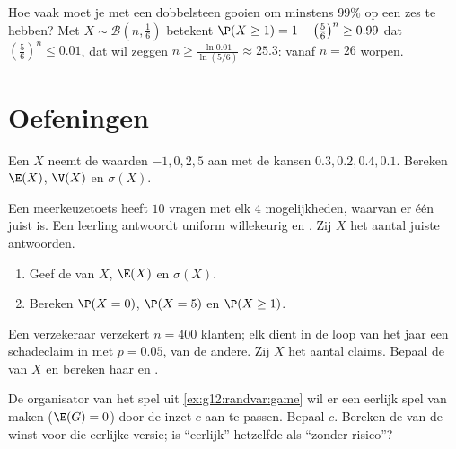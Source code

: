 \begin{example}\label{ex:g12:randvar:atleastone}
Hoe vaak moet je met een dobbelsteen gooien om minstens $99\%$  op een zes
te hebben? Met $X \sim \mathcal B\left(n, \frac16\right)$ betekent
$\P(X \geq 1) = 1 - \left(\frac56\right)^n \geq 0.99$ dat
$\left(\frac56\right)^n \leq 0.01$, dat wil zeggen
$n \geq \frac{\ln 0.01}{\ln(5/6)} \approx 25.3$: vanaf $n = 26$ worpen.
\end{example}

\section{Oefeningen}

\begin{exercise}[$\star$]\label{exo:g12:randvar:1}
Een  $X$ neemt de waarden $-1, 0, 2, 5$ aan met de kansen
$0.3, 0.2, 0.4, 0.1$. Bereken $\E(X)$, $\V(X)$ en $\sigma(X)$.
\end{exercise}

\begin{exercise}[$\star$]\label{exo:g12:randvar:2}
Een meerkeuzetoets heeft $10$ vragen met elk $4$ mogelijkheden, waarvan er één
juist is. Een leerling antwoordt uniform willekeurig en . Zij $X$
het aantal juiste antwoorden.
\begin{enumerate}
  \item Geef de  van $X$, $\E(X)$ en $\sigma(X)$.
  \item Bereken $\P(X = 0)$, $\P(X = 5)$ en $\P(X \geq 1)$.
\end{enumerate}
\end{exercise}

\begin{exercise}[$\star$]\label{exo:g12:randvar:3}
Een verzekeraar verzekert $n = 400$ klanten; elk dient in de loop van het jaar
een schadeclaim in met  $p = 0.05$,  van de andere. Zij $X$
het aantal claims. Bepaal de  van $X$ en bereken haar
 en .
\end{exercise}

\begin{exercise}[$\star\star$]\label{exo:g12:randvar:4}
De organisator van het spel uit \cref{ex:g12:randvar:game} wil er een eerlijk
spel van maken ($\E(G) = 0$) door de inzet $c$ aan te passen. Bepaal $c$.
Bereken de  van de winst voor die eerlijke versie; is ``eerlijk''
hetzelfde als ``zonder risico''?
\end{exercise}

